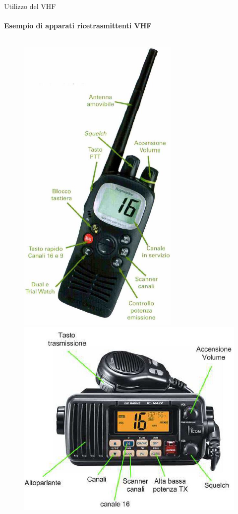 \documentclass[aspectratio=169]{beamer}
\begin{document}
\begin{frame}{Utilizzo del VHF}
	\framesubtitle{Esempio di apparati ricetrasmittenti VHF}
	\begin{figure}
		\begin{columns}
			 \includegraphics[width=0.7\textwidth]{Imgs/VHFPort}
			 \includegraphics[width=1\textwidth]{Imgs/VHFFis}
		\end{columns}
	\end{figure}
\end{frame}
\end{document}
